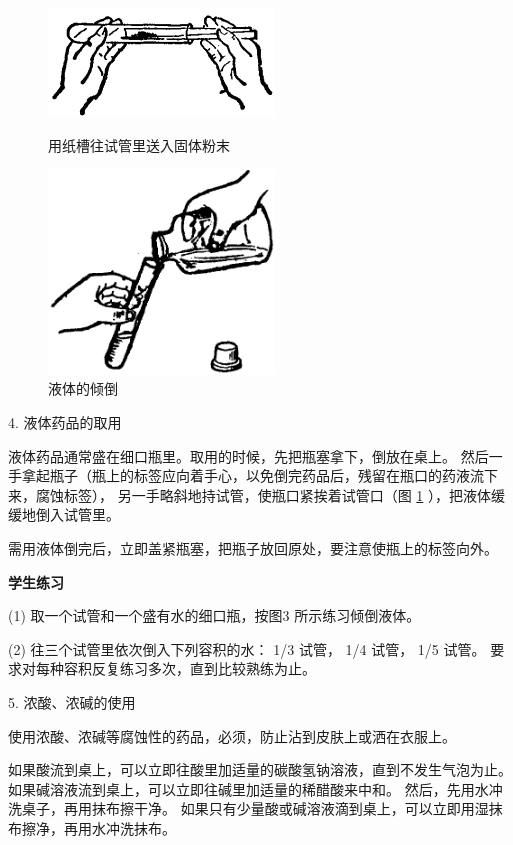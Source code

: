 \begin{figure}[htbp]
    \centering
    \begin{minipage}[b]{7cm}
        \centering
        \includegraphics[width=6cm]{../pic/czhx1-xssy-02}
        \caption{用纸槽往试管里送入固体粉末}\label{fig:xssy-2}
    \end{minipage}
    \qquad
    \begin{minipage}[b]{7cm}
        \centering
        \includegraphics[width=6cm]{../pic/czhx1-xssy-03}
        \caption{液体的倾倒}\label{fig:xssy-3}
    \end{minipage}
\end{figure}


4. 液体药品的取用

液体药品通常盛在细口瓶里。取用的时候，先把瓶塞拿下，倒放在桌上。
然后一手拿起瓶子（瓶上的标签应向着手心，以免倒完药品后，残留在瓶口的药液流下来，腐蚀标签），
另一手略斜地持试管，使瓶口紧挨着试管口（图 \ref{fig:xssy-3} ），把液体缓缓地倒入试管里。

需用液体倒完后，立即盖紧瓶塞，把瓶子放回原处，要注意使瓶上的标签向外。

\textbf{学生练习}

(1) 取一个试管和一个盛有水的细口瓶，按图3 所示练习倾倒液体。

(2) 往三个试管里依次倒入下列容积的水： 1/3 试管， 1/4 试管， 1/5 试管。
要求对每种容积反复练习多次，直到比较熟练为止。


5. 浓酸、浓碱的使用

使用浓酸、浓碱等腐蚀性的药品，必须，防止沾到皮肤上或洒在衣服上。

如果酸流到桌上，可以立即往酸里加适量的碳酸氢钠溶液，直到不发生气泡为止。
如果碱溶液流到桌上，可以立即往碱里加适量的稀醋酸来中和。
然后，先用水冲洗桌子，再用抹布擦干净。
如果只有少量酸或碱溶液滴到桌上，可以立即用湿抹布擦净，再用水冲洗抹布。

